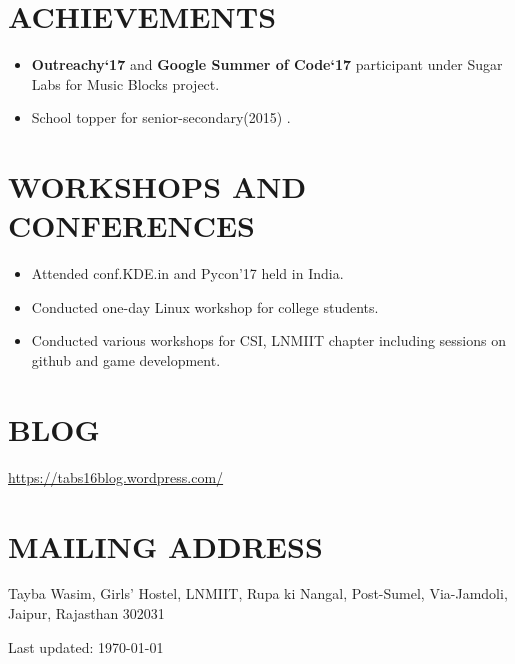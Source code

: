 \documentclass[margin]{res}
\begin{document}
\begin{resume}
\section{ACHIEVEMENTS}
	\begin{itemize}
		\item \textbf{Outreachy`17} and \textbf{Google Summer of Code`17} participant under Sugar Labs for Music Blocks project. 
		\item School topper for senior-secondary(2015) .
	\end{itemize}

\section{WORKSHOPS AND CONFERENCES}
	
	\begin{itemize}
		\item Attended conf.KDE.in and Pycon'17 held in India.
		\item Conducted one-day Linux workshop for college students.
		\item Conducted various workshops for CSI, LNMIIT chapter including sessions on github and game development.
\end{itemize} 

\section{BLOG}
\url{https://tabs16blog.wordpress.com/}

\section{MAILING ADDRESS}
Tayba Wasim, Girls' Hostel, LNMIIT, Rupa ki Nangal, Post-Sumel, Via-Jamdoli, Jaipur, Rajasthan 302031


 
\begin{center}
  \begin{footnotesize}
    Last updated: \today \\
  \end{footnotesize}
\end{center}

\end{resume}
\end{document}
